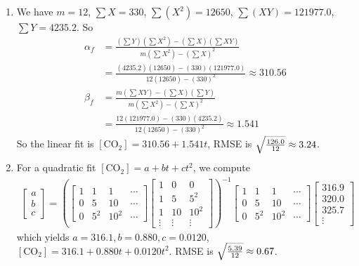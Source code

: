 \begin{Answer}
\begin{enumerate}[label=(\alph*)]
\item We have $m=12$, $\sum X=330$, $\sum (X^2)=12650$, $\sum (XY)=121977.0$, $\sum Y=4235.2$. So
\begin{align*}
\alpha_f &= \frac{(\sum Y) (\sum X^2) - (\sum X) (\sum XY)}{m(\sum X^2) - (\sum X)^2} \\
&= \frac{(4235.2) (12650) - (330) (121977.0)}{12(12650) - (330)^2} \approx 310.56 \\
\beta_f &= \frac{m (\sum XY) - (\sum X) (\sum Y)}{m(\sum X^2) - (\sum X)^2} \\
&= \frac{12 (121977.0) - (330) (4235.2)}{12(12650) - (330)^2} \approx 1.541
\end{align*}
So the linear fit is $[\text{CO}_2] = 310.56 + 1.541t$, RMSE is $\smash{\sqrt{\frac{126.0}{12}}} \approx 3.24$.
\item For a quadratic fit $[\text{CO}_2] = a + bt + ct^2$, we compute
\begin{align*}
\begin{bmatrix}
a\\
b\\
c  
\end{bmatrix}
=
\left(
\begin{bmatrix}
1 & 1 & 1 & \cdots \\
0 & 5 & 10 & \cdots \\
0 & 5^2 & 10^2 & \cdots
\end{bmatrix}
\begin{bmatrix}
1 & 0 & 0\\
1 & 5 & 5^2\\
1 & 10 & 10^2\\
\vdots & \vdots & \vdots
\end{bmatrix}\right)^{-1}
\begin{bmatrix}
1 & 1 & 1 & \cdots \\
0 & 5 & 10 & \cdots \\
0 & 5^2 & 10^2 & \cdots
\end{bmatrix}
\begin{bmatrix}
316.9\\
320.0\\
325.7\\
\vdots
\end{bmatrix}
\end{align*}
which yields $a = 316.1, b = 0.880, c= 0.0120$, $[\text{CO}_2] = 316.1 + 0.880t + 0.0120t^2$. RMSE is $\smash{\sqrt{\frac{5.39}{12}}} \approx 0.67$.
\end{enumerate}
\end{Answer}


